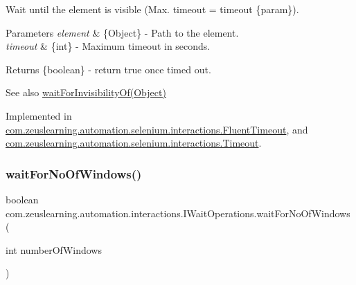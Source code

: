 Wait until the element is visible (Max. timeout = timeout \{param\}).


\begin{DoxyParams}{Parameters}
{\em element} & \{Object\} -\/ Path to the element. \\
\hline
{\em timeout} & \{int\} -\/ Maximum timeout in seconds.\\
\hline
\end{DoxyParams}
\begin{DoxyReturn}{Returns}
\{boolean\} -\/ return {\ttfamily true} once timed out.
\end{DoxyReturn}
\begin{DoxySeeAlso}{See also}
\hyperlink{interfacecom_1_1zeuslearning_1_1automation_1_1interactions_1_1IWaitOperations_a92e178778c5219ee00b59f5d8cdc8f94}{wait\+For\+Invisibility\+Of(\+Object)} 
\end{DoxySeeAlso}


Implemented in \hyperlink{classcom_1_1zeuslearning_1_1automation_1_1selenium_1_1interactions_1_1FluentTimeout_aa8c541ab4503e1c0bb835545e4ad717d}{com.\+zeuslearning.\+automation.\+selenium.\+interactions.\+Fluent\+Timeout}, and \hyperlink{classcom_1_1zeuslearning_1_1automation_1_1selenium_1_1interactions_1_1Timeout_aa8e8bb7ba589f1c9f4fbf8fd245e3028}{com.\+zeuslearning.\+automation.\+selenium.\+interactions.\+Timeout}.

\hypertarget{interfacecom_1_1zeuslearning_1_1automation_1_1interactions_1_1IWaitOperations_a609fd66e35b8217e83f499999785b370}{}\label{interfacecom_1_1zeuslearning_1_1automation_1_1interactions_1_1IWaitOperations_a609fd66e35b8217e83f499999785b370} 
\subsubsection{\texorpdfstring{wait\+For\+No\+Of\+Windows()}{waitForNoOfWindows()}}
{\footnotesize\ttfamily boolean com.\+zeuslearning.\+automation.\+interactions.\+I\+Wait\+Operations.\+wait\+For\+No\+Of\+Windows (\begin{DoxyParamCaption}\item[{int}]{number\+Of\+Windows }\end{DoxyParamCaption})}

